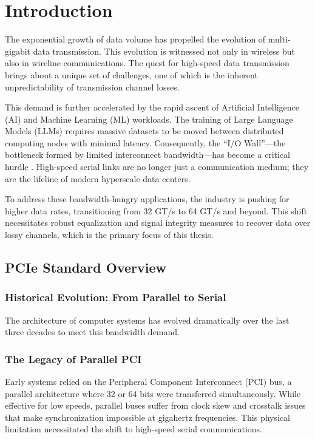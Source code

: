 \chapter{Introduction}
\label{Chapter5}

The exponential growth of data volume has propelled the evolution of multi-gigabit data transmission. This evolution is witnessed not only in wireless but also in wireline communications. The quest for high-speed data transmission brings about a unique set of challenges, one of which is the inherent unpredictability of transmission channel losses.

This demand is further accelerated by the rapid ascent of Artificial Intelligence (AI) and Machine Learning (ML) workloads. The training of Large Language Models (LLMs) requires massive datasets to be moved between distributed computing nodes with minimal latency. Consequently, the ``I/O Wall''—the bottleneck formed by limited interconnect bandwidth—has become a critical hurdle \cite{9269409}. High-speed serial links are no longer just a communication medium; they are the lifeline of modern hyperscale data centers.

To address these bandwidth-hungry applications, the industry is pushing for higher data rates, transitioning from 32 GT/s to 64 GT/s and beyond. This shift necessitates robust equalization and signal integrity measures to recover data over lossy channels, which is the primary focus of this thesis.


\section*{PCIe Standard Overview}

\subsection*{Historical Evolution: From Parallel to Serial}
The architecture of computer systems has evolved dramatically over the last three decades to meet this bandwidth demand.

\subsection*{The Legacy of Parallel PCI}
Early systems relied on the Peripheral Component Interconnect (PCI) bus, a parallel architecture where 32 or 64 bits were transferred simultaneously. While effective for low speeds, parallel buses suffer from clock skew and crosstalk issues that make synchronization impossible at gigahertz frequencies. This physical limitation necessitated the shift to high-speed serial communications.

